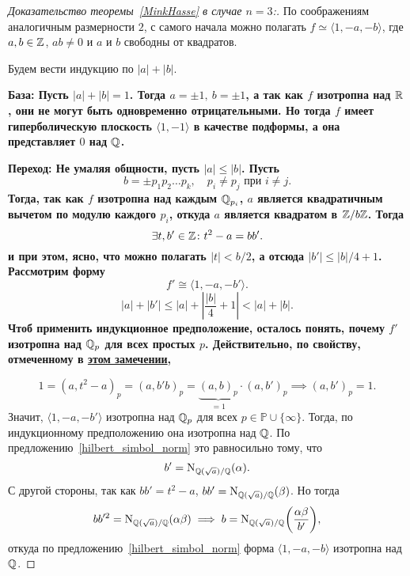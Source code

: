 	\begin{proof}[Доказательство теоремы~\ref{MinkHasse} в случае $n = 3$:]
		По соображениям аналогичным размерности $2$, с самого начала можно полагать $f \simeq \langle 1, -a, -b \rangle$, где  $a, b \in \mathbb{Z}$, $ab \neq 0$ и $a$ и $b$ свободны от квадратов. 

		Будем вести индукцию по $|a| + |b|$.

		\bf{База:} Пусть $|a| + |b| = 1$. Тогда $a = \pm 1, \ b = \pm 1$, а так как $f$ изотропна над $\mathbb{R}$, они не могут быть одновременно отрицательными. Но тогда $f$ имеет гиперболическую плоскость $\langle 1, -1 \rangle$ в качестве подформы, а она представляет $0$ над $\mathbb{Q}$. 

		\bf{Переход:} Не умаляя общности, пусть $|a| \le |b|$. Пусть
		\[
			b = \pm p_1 p_2 \ldots p_k, \quad p_i \neq p_j \text{ при } i \neq j.
		\]
		Тогда, так как $f$ изотропна над каждым $\mathbb{Q}_{p_i}$, $a$ является квадратичным вычетом по модулю каждого $p_i$, откуда $a$ является квадратом в $\mathbb{Z}/b\mathbb{Z}$. Тогда 
		\[
			\exists t, b'\in \mathbb{Z}\colon t^2 - a = b b'.
		\]
		и при этом, ясно, что можно полагать $|t| < b/2$, а отсюда $|b'| \le |b|/4 + 1$. Рассмотрим форму 
		\[
			f' \cong \langle 1, -a, -b' \rangle. 
		\]
		\[
			|a| + |b'| \le |a| + \left\lvert \frac{|b|}{4} + 1\right\rvert < |a| + |b|.
		\]
		Чтоб применить индукционное предположение, осталось понять, почему $f'$ изотропна над $\mathbb{Q}_{p}$ для всех простых $p$. Действительно, по свойству, отмеченному в \hyperlink{(1 - a, a)_p}{
		этом замечении}, 

		\[
			1 = (a, t^2 - a)_{p} = (a, b'b)_{p} = \underbrace{(a, b)_{p}}_{= 1} \cdot (a, b')_{p} \implies (a, b')_{p} = 1.
		\]
		Значит, $\langle 1, -a, -b' \rangle$ изотропна над $\mathbb{Q}_{p}$ для всех $p \in \mathbb{P} \cup \{ \infty \}$. Тогда, по индукционному предположению она изотропна над $\mathbb{Q}$. По предложению~\ref{hilbert_simbol_norm} это равносильно тому, что
		\[
			b' = \operatorname{\mathrm{N}}_{\mathbb{Q}(\sqrt{a})/\mathbb{Q}}(\alpha).
		\]
		С другой стороны, так как $b b' = t^2 - a$, $b b' = \operatorname{\mathrm{N}}_{\mathbb{Q}(\sqrt{a})/\mathbb{Q}}(\beta)$. Но тогда 
		\[
			b b'^2 = \Nm_{\Q(\sqrt{a})/\Q}(\alpha \beta) \implies b = \Nm_{\Q(\sqrt{a})/\Q}\lr*{\frac{\alpha \beta}{b'}}, 
		\]
		откуда по предложению~\ref{hilbert_simbol_norm} форма $\langle 1, -a, -b \rangle$ изотропна над $\mathbb{Q}$.
	\end{proof}
